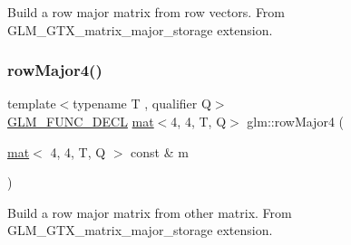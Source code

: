 Build a row major matrix from row vectors. From G\+L\+M\+\_\+\+G\+T\+X\+\_\+matrix\+\_\+major\+\_\+storage extension. \mbox{\label{group__gtx__matrix__major__storage_gac92ad1c2acdf18d3eb7be45a32f9566b}} 
\subsubsection{\texorpdfstring{row\+Major4()}{rowMajor4()}\hspace{0.1cm}{\footnotesize\ttfamily [2/2]}}
{\footnotesize\ttfamily template$<$typename T , qualifier Q$>$ \\
\mbox{\hyperlink{setup_8hpp_ab2d052de21a70539923e9bcbf6e83a51}{G\+L\+M\+\_\+\+F\+U\+N\+C\+\_\+\+D\+E\+CL}} \mbox{\hyperlink{structglm_1_1mat}{mat}}$<$4, 4, T, Q$>$ glm\+::row\+Major4 (\begin{DoxyParamCaption}\item[{\mbox{\hyperlink{structglm_1_1mat}{mat}}$<$ 4, 4, T, Q $>$ const \&}]{m }\end{DoxyParamCaption})}

Build a row major matrix from other matrix. From G\+L\+M\+\_\+\+G\+T\+X\+\_\+matrix\+\_\+major\+\_\+storage extension. 